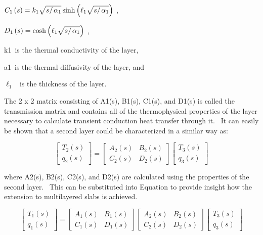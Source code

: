 \({C_1}\left( s \right) = {k_1}\sqrt {{s \mathord{\left/ {\vphantom {s {{\alpha_1}}}} \right. } {{\alpha_1}}}} \sinh \left( {{\ell_1}\sqrt {{s \mathord{\left/ {\vphantom {s {{\alpha_1}}}} \right. } {{\alpha_1}}}} } \right)\) ,

\({D_1}\left( s \right) = \cosh \left( {{\ell_1}\sqrt {{s \mathord{\left/ {\vphantom {s {{\alpha_1}}}} \right. } {{\alpha_1}}}} } \right)\) ,

k1~is the thermal conductivity of the layer,

a1~is the thermal diffusivity of the layer, and

\({\ell_1}\) ~is the thickness of the layer.

The 2 x 2 matrix consisting of A1(s), B1(s), C1(s), and D1(s) is called the transmission matrix and contains all of the thermophysical properties of the layer necessary to calculate transient conduction heat transfer through it.~ It can easily be shown that a second layer could be characterized in a similar way as:

\begin{equation}
\left[ {\begin{array}{*{20}{c}}{{T_2}\left( s \right)}\\ {{q_2}\left( s \right)}\end{array}} \right] = \left[ {\begin{array}{*{20}{c}}{{A_2}\left( s \right)}&{{B_2}\left( s \right)}\\ {{C_2}\left( s \right)}&{{D_2}\left( s \right)}\end{array}} \right]\left[ {\begin{array}{*{20}{c}}{{T_3}\left( s \right)}\\ {{q_3}\left( s \right)}\end{array}} \right]
\end{equation}

where A2(s), B2(s), C2(s), and D2(s) are calculated using the properties of the second layer.~ This can be substituted into Equation to provide insight how the extension to multilayered slabs is achieved.

\begin{equation}
\left[ {\begin{array}{*{20}{c}}{{T_1}\left( s \right)}\\ {{q_1}\left( s \right)}\end{array}} \right] = \left[ {\begin{array}{*{20}{c}}{{A_1}\left( s \right)}&{{B_1}\left( s \right)}\\ {{C_1}\left( s \right)}&{{D_1}\left( s \right)}\end{array}} \right]\left[ {\begin{array}{*{20}{c}}{{A_2}\left( s \right)}&{{B_2}\left( s \right)}\\ {{C_2}\left( s \right)}&{{D_2}\left( s \right)}\end{array}} \right]\left[ {\begin{array}{*{20}{c}}{{T_3}\left( s \right)}\\ {{q_3}\left( s \right)}\end{array}} \right]
\end{equation}


